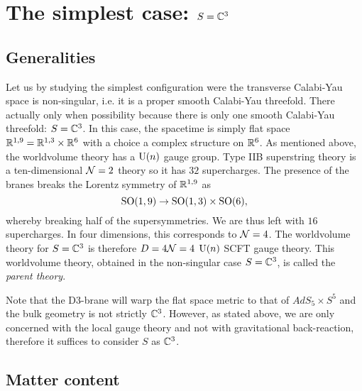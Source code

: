 \documentclass[a4paper,11pt]{article}
\begin{document}
\section{The simplest case: $S=\mathbb{C}^3$}

    \subsection{Generalities}

        Let us by studying the simplest configuration were the transverse Calabi-Yau space is non-singular, i.e. it is a proper smooth Calabi-Yau threefold. There actually only when possibility because there is only one smooth Calabi-Yau threefold: $S=\mathbb{C}^3$. In this case, the spacetime is simply flat space $\mathbb{R}^{1,9}=\mathbb{R}^{1,3}\times\mathbb{R}^6$ with a choice a complex structure on $\mathbb{R}^6$. As mentioned above, the worldvolume theory has a $\text{U}(n)$ gauge group. Type IIB superstring theory is a ten-dimensional $\mathcal{N}=2$ theory so it has $32$ supercharges. The presence of the branes breaks the Lorentz symmetry of $\mathbb{R}^{1,9}$ as
        \begin{equation}
            \text{SO}(1,9)\to\text{SO}(1,3)\times\text{SO}(6),
        \end{equation}
        whereby breaking half of the supersymmetries. We are thus left with $16$ supercharges. In four dimensions, this corresponds to $\mathcal{N}=4$. The worldvolume theory for $S=\mathbb{C}^3$ is therefore $D=4\mathcal{N}=4$ $\text{U}(n)$ SCFT gauge theory. This worldvolume theory, obtained in the non-singular case $S=\mathbb{C}^3$, is called the \emph{parent theory}.

        Note that the D$3$-brane will warp the flat space metric to that of $AdS_5\times S^5$ and the bulk geometry is not strictly $\mathbb{C}^3$. However, as stated above, we are only concerned with the local gauge theory and not with gravitational back-reaction, therefore it suffices to consider $S$ as $\mathbb{C}^3$.

    \subsection{Matter content}
\end{document}
